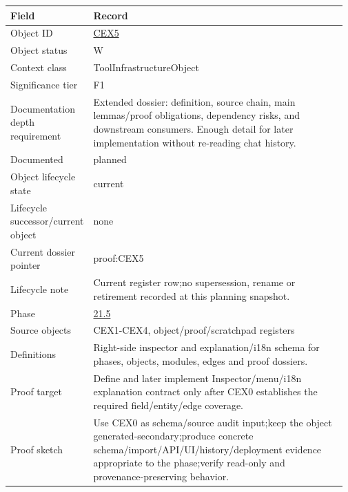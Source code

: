 \begin{longtable}{L{0.16\linewidth} L{0.81\linewidth}}
\hline
\textbf{Field} & \textbf{Record}\\
\hline
Object ID & \hyperlink{object-row-CEX5}{CEX5}\\
\hline\addlinespace[0.20em]
Object status & W\\
\hline\addlinespace[0.20em]
Context class & ToolInfrastructureObject\\
\hline\addlinespace[0.20em]
Significance tier & F1\\
\hline\addlinespace[0.20em]
Documentation depth requirement & Extended dossier: definition, source chain, main lemmas/\allowbreak{}proof obligations, dependency risks, and downstream consumers. Enough detail for later implementation without re-reading chat history.\\
\hline\addlinespace[0.20em]
Documented & planned\\
\hline\addlinespace[0.20em]
Object lifecycle state & current\\
\hline\addlinespace[0.20em]
Lifecycle successor/\allowbreak{}current object & none\\
\hline\addlinespace[0.20em]
Current dossier pointer & proof:CEX5\\
\hline\addlinespace[0.20em]
Lifecycle note & Current register row;\newline no supersession, rename or retirement recorded at this planning snapshot.\\
\hline\addlinespace[0.20em]
Phase & \hyperlink{phase-row-21-5}{21.5}\\
\hline\addlinespace[0.20em]
Source objects & CEX1-CEX4, object/\allowbreak{}proof/\allowbreak{}scratchpad registers\\
\hline\addlinespace[0.20em]
Definitions & Right-side inspector and explanation/\allowbreak{}i18n schema for phases, objects, modules, edges and proof dossiers.\\
\hline\addlinespace[0.20em]
Proof target & Define and later implement Inspector/\allowbreak{}menu/\allowbreak{}i18n explanation contract only after CEX0 establishes the required field/\allowbreak{}entity/\allowbreak{}edge coverage.\\
\hline\addlinespace[0.20em]
Proof sketch & Use CEX0 as schema/\allowbreak{}source audit input;\newline keep the object generated-secondary;\newline produce concrete schema/\allowbreak{}import/\allowbreak{}API/\allowbreak{}UI/\allowbreak{}history/\allowbreak{}deployment evidence appropriate to the phase;\newline verify read-only and provenance-preserving behavior.\\

\end{longtable}
